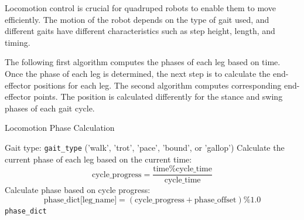 \documentclass[a4paper,11pt]{article}
\begin{document}
Locomotion control is crucial for quadruped robots to enable them to move efficiently. The motion of the robot depends on the type of gait used, and different gaits have different characteristics such as step height, length, and timing.

The following first algorithm computes the phases of each leg based on time. Once the phase of each leg is determined, the next step is to calculate the end-effector positions for each leg.
The second algorithm computes corresponding end-effector points. The position is calculated differently for the stance and swing phases of each gait cycle.

\begin{algorithm}[H]
	\caption{Locomotion Phase Calculation}
	\begin{algorithmic}[1]
		\Require Gait type: \texttt{gait\_type} ('walk', 'trot', 'pace', 'bound', or 'gallop')
		\State Calculate the current phase of each leg based on the current time:
		$$
			\text{cycle\_progress} = \frac{\text{time} \% \text{cycle\_time}}{\text{cycle\_time}}
		$$
			\State Calculate phase based on cycle progress:
			$$
				\text{phase\_dict[leg\_name]} = (\text{cycle\_progress} + \text{phase\_offset}) \% 1.0
			$$
		\EndFor
		\State \Return \texttt{phase\_dict}
	\end{algorithmic}
\end{algorithm}
\end{document}
